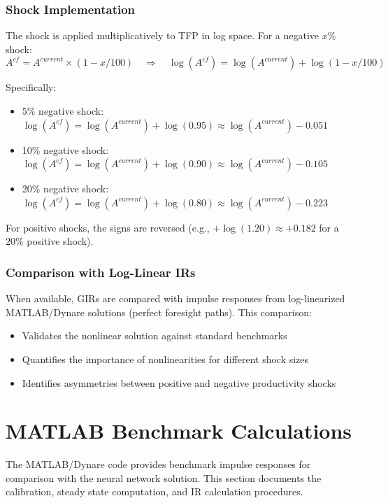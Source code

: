 \documentclass[11pt]{article}
\begin{document}
\subsubsection{Shock Implementation}
The shock is applied multiplicatively to TFP in log space. For a negative $x$\% shock:
\begin{equation}
    A^{cf} = A^{current} \times (1 - x/100) \quad \Rightarrow \quad \log(A^{cf}) = \log(A^{current}) + \log(1 - x/100)
\end{equation}

Specifically:
\begin{itemize}
    \item 5\% negative shock: $\log(A^{cf}) = \log(A^{current}) + \log(0.95) \approx \log(A^{current}) - 0.051$
    \item 10\% negative shock: $\log(A^{cf}) = \log(A^{current}) + \log(0.90) \approx \log(A^{current}) - 0.105$
    \item 20\% negative shock: $\log(A^{cf}) = \log(A^{current}) + \log(0.80) \approx \log(A^{current}) - 0.223$
\end{itemize}

For positive shocks, the signs are reversed (e.g., $+\log(1.20) \approx +0.182$ for a 20\% positive shock).

\subsubsection{Comparison with Log-Linear IRs}
When available, GIRs are compared with impulse responses from log-linearized MATLAB/Dynare solutions (perfect foresight paths). This comparison:
\begin{itemize}
    \item Validates the nonlinear solution against standard benchmarks
    \item Quantifies the importance of nonlinearities for different shock sizes
    \item Identifies asymmetries between positive and negative productivity shocks
\end{itemize}

\section{MATLAB Benchmark Calculations}

The MATLAB/Dynare code provides benchmark impulse responses for comparison with the neural network solution. This section documents the calibration, steady state computation, and IR calculation procedures.
\end{document}
